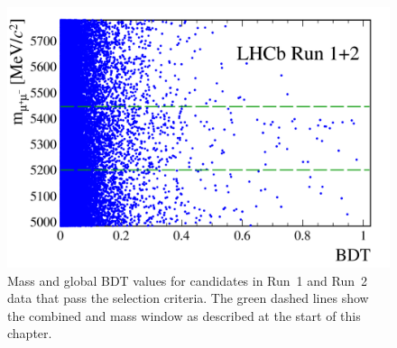 \begin{figure}[tbp]
    \centering
    \includegraphics[width=\textwidth]{./Figs/Selection/hidef_Fig3.png}
    \caption{Mass and global BDT values for candidates in Run~1 and Run~2 data that pass the \bmumu selection criteria. The green dashed lines show the combined \bs and \bd mass window as described at the start of this chapter.}
    \label{fig:BFdata}
\end{figure}

